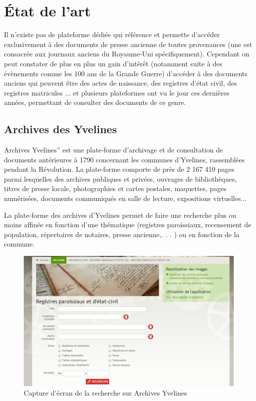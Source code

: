 \section{État de l'art}
\label{sec:etat_art}
    Il n’existe pas de plateforme dédiée qui référence et permette d’accéder exclusivement à des documents de presse ancienne de toutes
    provenances (une est consacrée aux journaux anciens du Royaume-Uni spécifiquement). Cependant
    on peut constater de plus en plus un gain d’intérêt (notamment suite à des évènements comme les 100 ans de la Grande Guerre)
    d’accéder à des documents anciens qui peuvent être des actes de naissance, des registres d’état civil, des registres matricules ...
    et plusieurs plateformes ont vu le jour ces dernières années, permettant de consulter des documents de ce genre.


        \subsection{Archives des Yvelines}
        \label{subsec:yvelines}
        Archives Yvelines” est une plate-forme d’archivage et de consultation de documents antérieures à 1790
        concernant les communes d’Yvelines, rassemblées pendant la Révolution. La plate-forme comporte de près
        de 2 167 410 pages parmi lesquelles des archives publiques et privées, ouvrages de bibliothèques, titres de presse locale,
        photographies et cartes postales, maquettes, pages numérisées, documents communiqués en salle de lecture, expositions virtuelles...

        La plate-forme des archives d’Yvelines permet de faire une recherche plus ou moins affinée en fonction d’une thématique
        (registres paroissiaux, recensement de population, répertoires de notaires, presse ancienne,. . . ) ou en fonction de la commune.

        \begin{figure}[h!]
            \centering
            \includegraphics[width=1\textwidth]{figure/screen_yvelines_recherche.png}
            \caption{Capture d'écran de la recherche sur Archives Yvelines}
            \label{fig:yvelines_recherche}
        \end{figure}

